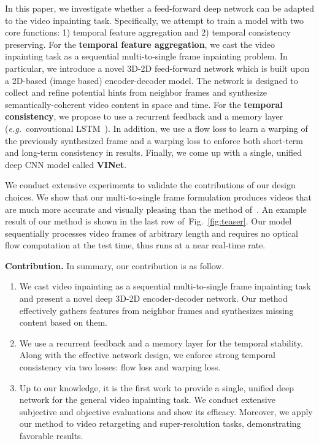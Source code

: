 \documentclass[10pt,twocolumn,letterpaper]{article}
\newcommand{\figref}[1]{Fig.~\ref{#1}}
\renewcommand{\paragraph}[1]{\vspace{1mm}\noindent\textbf{#1}}
\renewcommand{\eg}{\textit{e.g.}}
\begin{document}
In this paper, we investigate whether a feed-forward deep network can be adapted to the video inpainting task. Specifically, we attempt to train a model with two core functions: 1) temporal feature aggregation and 2) temporal consistency preserving.
For the \textbf{temporal feature aggregation}, we cast the video inpainting task as a sequential multi-to-single frame inpainting problem. In particular, we introduce a novel 3D-2D feed-forward network which is built upon a 2D-based (image based) encoder-decoder model. The network is designed to collect and refine potential hints from neighbor frames and synthesize semantically-coherent video content in space and time. For the \textbf{temporal consistency}, we propose to use a recurrent feedback and a memory layer (\eg~convoutional LSTM~\cite{xingjian2015convolutional}). In addition, we use a flow loss to learn a warping of the previously synthesized frame and a warping loss to enforce both short-term and long-term consistency in results. Finally, we come up with a single, unified deep CNN model called \textbf{VINet}. 

We conduct extensive experiments to validate the contributions of our design choices. We show that our multi-to-single frame formulation produces videos that are much more accurate and visually pleasing than the method of~\cite{yu2018generative}. An example result of our method is shown in the last row of~\figref{fig:teaser}. Our model sequentially processes video frames of arbitrary length and requires no optical flow computation at the test time, thus runs at a near real-time rate.

\paragraph{Contribution.} In summary, our contribution is as follow.
\begin{enumerate}[topsep=0pt,itemsep=0pt]
\item  We cast video inpainting as a sequential multi-to-single frame inpainting task and present a novel deep 3D-2D encoder-decoder network. Our method effectively gathers features from neighbor frames and synthesizes missing content based on them.
\item  We use a recurrent feedback and a memory layer for the temporal stability. Along with the effective network design, we enforce strong temporal consistency via two losses: flow loss and warping loss.
\item  Up to our knowledge, it is the first work to provide a single, unified deep network for the general video inpainting task. We conduct extensive subjective and objective evaluations and show its efficacy. Moreover, we apply our method to video retargeting and super-resolution tasks, demonstrating favorable results.
\end{enumerate}
\end{document}
